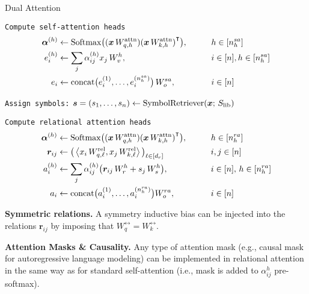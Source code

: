 \begin{algorithm}[ht!]
	\caption{Dual Attention}\label{alg:dual_head_attn}

    \vspace{1em}

    \texttt{Compute self-attention heads}
    \begin{align*}
        \bm{\alpha}^{(h)} &\gets \mathrm{Softmax}\big({(\bm{x} \, W_{q, h}^{\mathrm{attn}})} {(\bm{x} \, W_{k, h}^{\mathrm{attn}})}^\intercal\big), \qquad && h \in [n_h^{sa}] \\
        e_i^{(h)} &\gets \sum_{j} \alpha_{ij}^{(h)} x_j \, W_v^h, \qquad && i \in [n], h \in [n_h^{sa}]\\
        e_i &\gets \mathrm{concat}\big(e_i^{(1)}, \ldots, e_i^{(n_h^{sa})}\big) \, W_o^{sa}, && i \in [n]
    \end{align*}

    \texttt{Assign symbols:} $\bm{s} = (s_1, \ldots, s_n) \gets \mathrm{SymbolRetriever}(\bm{x};\,S_\mathrm{lib})$
    \vspace{0.5em}

    \texttt{Compute relational attention heads}
    \begin{align*}
        \bm{\alpha}^{(h)} &\gets \mathrm{Softmax}\big({(\bm{x} \, W_{q, h}^{\mathrm{attn}})} {(\bm{x} \, W_{k, h}^{\mathrm{attn}})}^\intercal\big), \qquad && h \in [n_h^{ra}] \\
        \bm{r}_{ij} &\gets \big(\left \langle x_i \, W_{q, \ell}^{\mathrm{rel}}, x_j \, W_{k, \ell}^{\mathrm{rel}} \right\rangle\big)_{\ell \in [d_r]} \qquad && i,j \in [n] \\
        a_i^{(h)} &\gets \sum_{j} \alpha_{ij}^{(h)} \big(\bm{r}_{ij}\,W_r^h + s_j \, W_s^{h}\big), \qquad && i \in [n],\, h \in [n_h^{ra}]\\
        a_i &\gets \mathrm{concat}\big(a_i^{(1)}, \ldots, a_i^{(n_h^{ra})}\big) W_o^{ra}, && i \in [n]
    \end{align*}


\end{algorithm}

\textbf{Symmetric relations.} A symmetry inductive bias can be injected into the relations $\bm{r}_{ij}$ by imposing that $W_{q}^{\rel} = W_k^{\rel}$.

\textbf{Attention Masks \& Causality.} Any type of attention mask (e.g., causal mask for autoregressive language modeling) can be implemented in relational attention in the same way as for standard self-attention (i.e., mask is added to $\alpha_{ij}^h$ pre-softmax).

